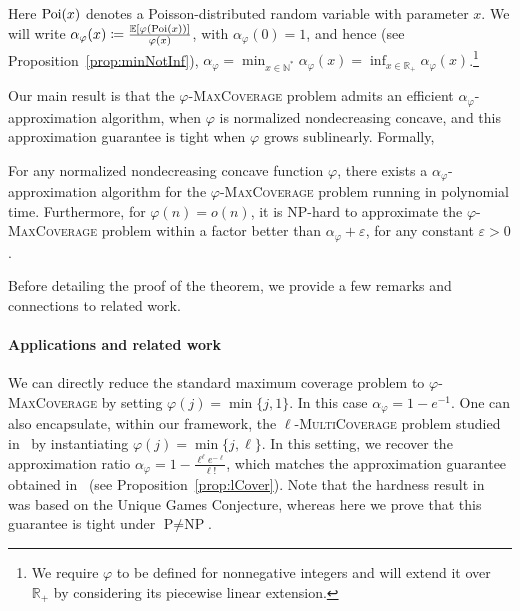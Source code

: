 Here $\operatorname{\text{Poi}}(x)$ denotes a Poisson-distributed random variable with parameter $x$. We will write $\alpha_{\varphi}(x) \coloneqq \frac{\mathbb{E}[\varphi(\operatorname{\text{Poi}}(x))]}{\varphi(x)}$, with $\alpha_{\varphi}(0) = 1$, and hence (see Proposition~\ref{prop:minNotInf}), $\alpha_{\varphi}  = \min_{x \in  \mathbb{N}^*} \alpha_{\varphi}(x) = \inf_{x \in \mathbb{R}_+} \alpha_{\varphi}(x)$.\footnote{We require $\varphi$ to be defined for nonnegative integers and will extend it over $\mathbb{R}_+$ by considering its piecewise linear extension.}

Our main result is that the $\varphi$-\textsc{MaxCoverage} problem admits an efficient $\alpha_\varphi$-approximation algorithm, when $\varphi$ is normalized nondecreasing concave, and this approximation guarantee is tight when $\varphi$ grows sublinearly. Formally,  

\begin{theorem}
For any normalized nondecreasing concave function $\varphi$, there exists a $\alpha_\varphi$-approximation algorithm for the $\varphi$-\textsc{MaxCoverage} problem running in polynomial time. Furthermore, for $\varphi(n) = o(n)$, it is \textrm{NP}-hard to approximate the $\varphi$-\textsc{MaxCoverage} problem within a factor better than $\alpha_\varphi + \varepsilon$, for any constant $\varepsilon >0$.
\label{theo:main}
\end{theorem}

Before detailing the proof of the theorem, we provide a few remarks and connections to related work.

\paragraph{Applications and related work}
We can directly reduce the standard maximum coverage problem to $\varphi$-\textsc{MaxCoverage} by setting $\varphi(j) = \min\{ j,1\}$. In this case $\alpha_{\varphi} = 1 - e^{-1}$. One can also encapsulate, within our framework, the $\ell$-\textsc{MultiCoverage} problem studied in~\cite{BFGG20} by instantiating $\varphi(j) = \min\{ j,\ell\}$. In this setting, we recover the approximation ratio $\alpha_{\varphi} = 1-\frac{\ell^{\ell}e^{-\ell}}{\ell!}$, which matches the approximation guarantee obtained in~\cite{BFGG20} (see Proposition~\ref{prop:lCover}). Note that the hardness result in~\cite{BFGG20} was based on the Unique Games Conjecture, whereas here we prove that this guarantee is tight under $\textrm{P} \not= \textrm{NP}$.


